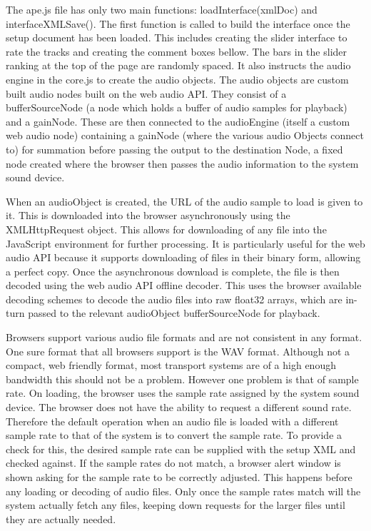 \documentclass{article}
\begin{document}
The ape.js file has only two main functions: loadInterface(xmlDoc) and interfaceXMLSave(). The first function is called to build the interface once the setup document has been loaded. This includes creating the slider interface to rate the tracks and creating the comment boxes bellow. The bars in the slider ranking at the top of the page are randomly spaced. It also instructs the audio engine in the core.js to create the audio objects. The audio objects are custom built audio nodes built on the web audio API. They consist of a bufferSourceNode (a node which holds a buffer of audio samples for playback) and a gainNode. These are then connected to the audioEngine (itself a custom web audio node) containing a gainNode (where the various audio Objects connect to) for summation before passing the output to the destination Node, a fixed node created where the browser then passes the audio information to the system sound device.

When an audioObject is created, the URL of the audio sample to load is given to it. This is downloaded into the browser asynchronously using the XMLHttpRequest object. This allows for downloading of any file into the JavaScript environment for further processing. It is particularly useful for the web audio API because it supports downloading of files in their binary form, allowing a perfect copy. Once the asynchronous download is complete, the file is then decoded using the web audio API offline decoder. This uses the browser available decoding schemes to decode the audio files into raw float32 arrays, which are in-turn passed to the relevant audioObject bufferSourceNode for playback.

Browsers support various audio file formats and are not consistent in any format. One sure format that all browsers support is the WAV format. Although not a compact, web friendly format, most transport systems are of a high enough bandwidth this should not be a problem. However one problem is that of sample rate. On loading, the browser uses the sample rate assigned by the system sound device. The browser does not have the ability to request a different sound rate. Therefore the default operation when an audio file is loaded with a different sample rate to that of the system is to convert the sample rate. To provide a check for this, the desired sample rate can be supplied with the setup XML and checked against. If the sample rates do not match, a browser alert window is shown asking for the sample rate to be correctly adjusted. This happens before any loading or decoding of audio files. Only once the sample rates match will the system actually fetch any files, keeping down requests for the larger files until they are actually needed.
\end{document}
